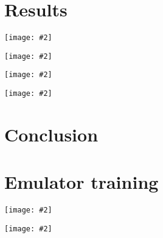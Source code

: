 \documentclass[aps, prc, reprint, amsmath]{revtex4-1}
\newcommand{\widefig}[3][t]{
  \begin{figure*}[#1]
    \texttt{[image: \#2]}
    \caption{\label{fig:#2}#3}
  \end{figure*}
}
\begin{document}
\section{Results}

\cite{alice-cumulants}
\cite{osu1, osu2}

\widefig{calibration_posterior_glb}{
  Posterior marginal and joint distributions of the calibration parameters for the Glauber model.  On the
  diagonal are histograms of MCMC samples for the respective parameters, on the lower triangle are
  two-dimensional histograms of MCMC samples showing the correlation between pairs of parameters.
  The upper triangle is blank for now. \textbf{FIXME}
}

\widefig{calibration_posterior_kln}{
  Same as FIG.~\ref{fig:calibration_posterior_glb} for the KLN model.
}

\widefig{posterior_draws_glb}{
  Random realizations of the calibrated posterior for the Glauber model.  Similar to
  FIG.~\ref{fig:prior_draws_glb}, except the lines are posterior emulator predictions instead of explicit
  prior calculations.  The red line is the maximum a posteriori point of the MCMC chain.
}

\widefig{posterior_draws_kln}{
  Same as FIG.~\ref{fig:posterior_draws_glb} for the KLN model.
}



\section{Conclusion}



\appendix


\section{Emulator training}

\widefig{training_posterior_glb}{
  Posterior marginal and joint distributions of the Gaussian process hyperparameters for the first Glauber
  principal component.  The notation $\ell\;x$ means the squared-exponential correlation length for parameter $x$. \textbf{IMPROVE THIS}
  On the diagonal are histograms of MCMC samples for the respective hyperparameters, on the lower triangle are
  two-dimensional histograms of MCMC samples showing the correlation between pairs of hyperparameters.  The
  upper triangle is blank for now. \textbf{FIXME}
}

\widefig{training_posterior_kln}{
  Same as FIG.~\ref{fig:training_posterior_glb} for the KLN model.
}




\end{document}
